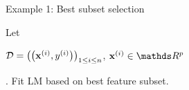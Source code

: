 \documentclass[11pt,compress,t,notes=noshow, xcolor=table]{beamer}
\begin{document}
\begin{vbframe}{Example 1: Best subset selection}














Let \begin{footnotesize}$\mathcal{D} = \left(\left(\mathbf{x}^{(i)}, y^{(i)}\right)\right)_{1 \le i \le n}$, $\xi \in \R^p$\end{footnotesize}. Fit LM based on best feature subset. 


\end{vbframe}
\end{document}
